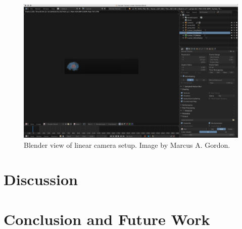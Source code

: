 \documentclass[acmlarge,screen]{acmart}
\begin{document}
\begin{figure}[h]
  \centering
  \includegraphics[width=\linewidth]{lin-cam1}
  \caption{Blender view of linear camera setup. Image by Marcus A. Gordon.}
\end{figure}

\section{Discussion}

\section{Conclusion and Future Work}
\end{document}
